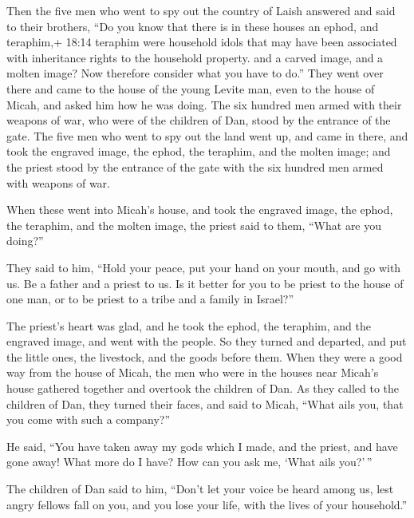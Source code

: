  Then the five men who went to spy out the country of Laish
answered and said to their brothers, ``Do you know that there is in
these houses an ephod, and teraphim,+ 18:14 teraphim were household
idols that may have been associated with inheritance rights to the
household property. and a carved image, and a molten image? Now
therefore consider what you have to do.''  They went over
there and came to the house of the young Levite man, even to the house
of Micah, and asked him how he was doing.  The six hundred
men armed with their weapons of war, who were of the children of Dan,
stood by the entrance of the gate.  The five men who went
to spy out the land went up, and came in there, and took the engraved
image, the ephod, the teraphim, and the molten image; and the priest
stood by the entrance of the gate with the six hundred men armed with
weapons of war.

 When these went into Micah's house, and took the engraved
image, the ephod, the teraphim, and the molten image, the priest said to
them, ``What are you doing?''

 They said to him, ``Hold your peace, put your hand on your
mouth, and go with us. Be a father and a priest to us. Is it better for
you to be priest to the house of one man, or to be priest to a tribe and
a family in Israel?''

 The priest's heart was glad, and he took the ephod, the
teraphim, and the engraved image, and went with the people.
 So they turned and departed, and put the little ones, the
livestock, and the goods before them.  When they were a
good way from the house of Micah, the men who were in the houses near
Micah's house gathered together and overtook the children of Dan.
 As they called to the children of Dan, they turned their
faces, and said to Micah, ``What ails you, that you come with such a
company?''

 He said, ``You have taken away my gods which I made, and
the priest, and have gone away! What more do I have? How can you ask me,
`What ails you?'\,''

 The children of Dan said to him, ``Don't let your voice be
heard among us, lest angry fellows fall on you, and you lose your life,
with the lives of your household.''

